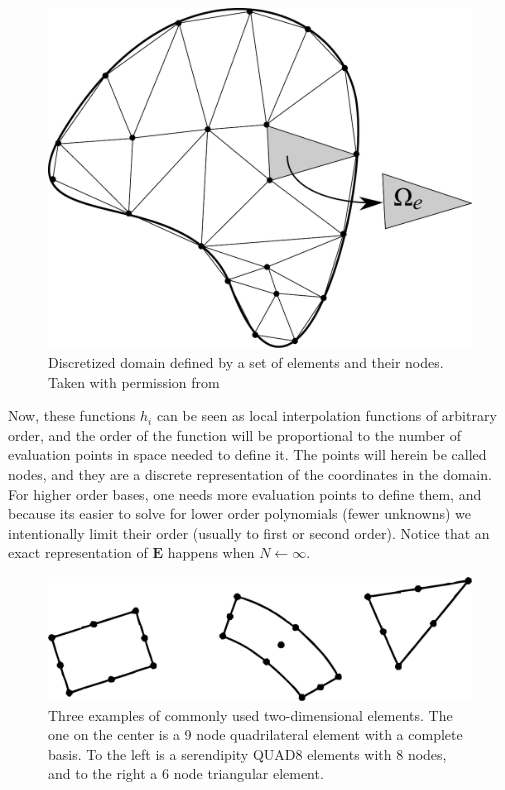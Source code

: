 \begin{figure}
\centering
\includegraphics[scale=0.3]{./img/dominio_discreto.pdf}
\caption{Discretized domain defined by a set of elements and their nodes. Taken with permission from \cite{Guarin2012}}
\label{fig:disc_domain}
\end{figure}
Now, these functions $h_i$ can be seen as local interpolation functions of arbitrary order, and the order of the function will be proportional to the number of evaluation points in space needed to define it. The points will herein be called nodes, and they are a discrete representation of the coordinates in the domain. For higher order bases, one needs more evaluation points to define them, and because its easier to solve for lower order polynomials (fewer unknowns) we intentionally limit their order (usually to first or second order). Notice that an exact representation of $\mathbf{E}$ happens when $N\leftarrow\infty$.

\begin{figure}
\centering
\includegraphics[scale=0.5]{./img/two_dim_elem.pdf}
\caption{Three examples of commonly used two-dimensional elements. The one on the center is a 9 node quadrilateral element with a complete basis. To the left is a serendipity QUAD8 elements with 8 nodes, and to the right a 6 node triangular element.\cite{Bathe1996}}
\label{fig:2d_elem}
\end{figure}

